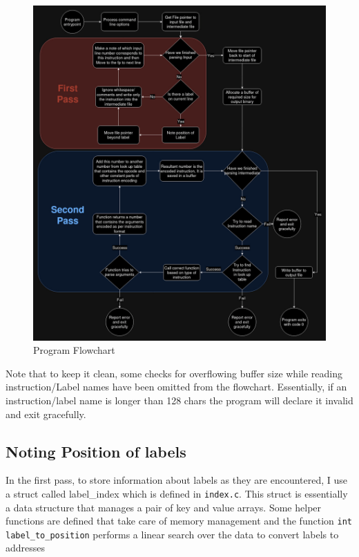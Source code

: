 \documentclass[12pt]{article}
\begin{document}
    \begin{figure}[h!]
        \centering
        \includegraphics[width=1\linewidth]{Flowchart.png}
        \caption{Program Flowchart}
        \label{fig:flowchart}
    \end{figure}

    Note that to keep it clean, some checks for overflowing buffer size while reading instruction/Label names have been omitted from the flowchart. Essentially, if an instruction/label name is longer than 128 chars the program will declare it invalid and exit gracefully.
    \\

    \subsection{Noting Position of labels}
    In the first pass, to store information about labels as they are encountered, I use a struct called label\_index which is defined in \verb#index.c#. This struct is essentially a data structure that manages a pair of key and value arrays. Some helper functions are defined that take care of memory management and the function \verb#int label_to_position# performs a linear search over the data to convert labels to addresses
    
\end{document}
